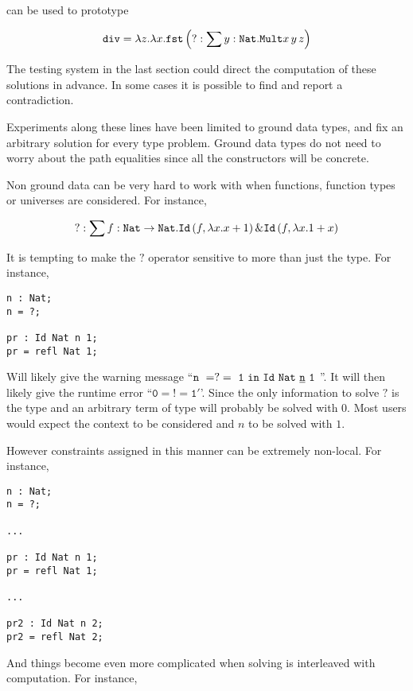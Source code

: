 can be used to prototype

\[
\mathtt{div}=\lambda z.\lambda x.\mathtt{fst}\left(?:\sum y:\mathtt{Nat}{}.\mathtt{Mult}x\,y\,z\right)
\]

The testing system in the last section could direct the computation of these solutions in advance.
In some cases it is possible to find and report a contradiction. 

Experiments along these lines have been limited to ground data types, and fix an arbitrary solution for every type problem.
Ground data types do not need to worry about the path equalities since all the constructors will be concrete.

Non ground data can be very hard to work with when functions, function types or universes are considered.
For instance,

\[
?:\sum f:\mathtt{Nat}{}\rightarrow\mathtt{Nat}{}.\mathtt{Id}\left(f,\lambda x.x+1\right)\&\mathtt{Id}\left(f,\lambda x.1+x\right)
\]

It is tempting to make the $?$ operator sensitive to more than just the type.
For instance,

\begin{lstlisting}
n : Nat;
n = ?;

pr : Id Nat n 1;
pr = refl Nat 1;
\end{lstlisting}

Will likely give the warning message ``$\mathtt{n\ =?=\ 1\ in\ Id\ Nat\ \uline{n}\ 1}$ ''.
It will then likely give the runtime error ``$\mathtt{0=!=1'}$'.
Since the only information to solve $\mathtt{?}$ is the type \Nat{} and an arbitrary term of type \Nat{} will probably be solved with 0.
Most users would expect the context to be considered and $n$ to be solved with $1$.

However constraints assigned in this manner can be extremely non-local.
For instance,

\begin{lstlisting}[basicstyle={\ttfamily}]
n : Nat;
n = ?;

...

pr : Id Nat n 1;
pr = refl Nat 1;

...

pr2 : Id Nat n 2;
pr2 = refl Nat 2;
\end{lstlisting}

And things become even more complicated when solving is interleaved with computation.
For instance,

